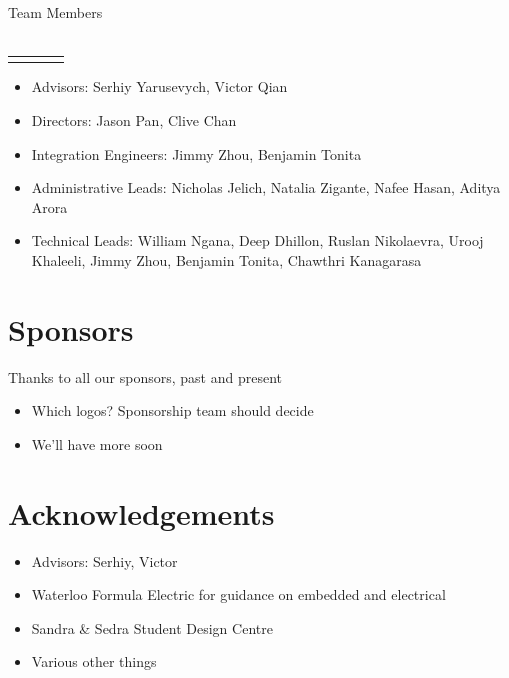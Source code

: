 \documentclass{report}
\begin{document}
    \begin{center}
        \textsf{Team Members}\\
        \hfill\\
        \begin{tabular}{| c | c | c | c |}
            \hline
            &   &   & \\
            \hline
            &   &   & \\
            \hline
        \end{tabular}
    \end{center}
    \begin{itemize}
        \item Advisors: Serhiy Yarusevych, Victor Qian
        \item Directors: Jason Pan, Clive Chan
        \item Integration Engineers: Jimmy Zhou, Benjamin Tonita
        \item Administrative Leads: Nicholas Jelich, Natalia Zigante, Nafee Hasan, Aditya Arora
        \item Technical Leads: William Ngana, Deep Dhillon, Ruslan Nikolaevra, Urooj Khaleeli, Jimmy Zhou, Benjamin Tonita, Chawthri Kanagarasa
    \end{itemize}
    
    \section{Sponsors}
    Thanks to all our sponsors, past and present
    
    \begin{itemize}
        \item Which logos? Sponsorship team should decide
        \item We’ll have more soon
    \end{itemize}
    
    \section{Acknowledgements}
    
    \begin{itemize}
        \item Advisors: Serhiy, Victor
        \item Waterloo Formula Electric for guidance on embedded and electrical
        \item Sandra \& Sedra Student Design Centre
        \item Various other things
    \end{itemize}
    
\end{document}
